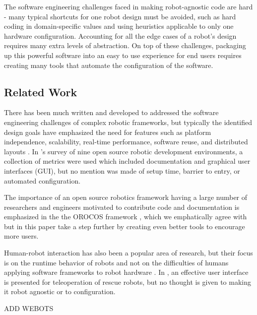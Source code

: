 \documentclass[10pt,journal,compsoc]{joser1}
\begin{document}
{The software engineering challenges faced in making robot-agnostic code are hard - many typical shortcuts for one robot design must be avoided, such as hard coding in domain-specific values and using heuristics applicable to only one hardware configuration. Accounting for all the edge cases of a robot's design requires many extra levels of abstraction. On top of these challenges, packaging up this powerful software into an easy to use experience for end users requires creating many tools that automate the configuration of the software.

\subsection{Related Work}

There has been much written and developed to addressed the software engineering challenges of complex robotic frameworks, but typically the identified design goals have emphasized the need for features such as platform independence, scalability, real-time performance, software reuse, and distributed layouts \cite{realtime_framework, collett2005player, kramer2007development}. In \cite{kramer2007development}'s survey of nine open source robotic development environments, a collection of metrics were used which included documentation and graphical user interfaces (GUI), but no mention was made of setup time, barrier to entry, or automated configuration. 

The importance of an open source robotics framework having a large number of researchers and engineers motivated to contribute code and documentation is emphasized in the the OROCOS framework \cite{bruyninckx2001open}, which we emphatically agree with but in this paper take a step further by creating even better tools to encourage more users.
  
Human-robot interaction has also been a popular area of research, but their focus is on the runtime behavior of robots and not on the difficulties of humans applying software frameworks to robot hardware \cite{hci_metrics, yancotaxonomy, goodrichseven}. In \cite{rescueRobots}, an effective user interface is presented for teleoperation of rescue robots, but no thought is given to making it robot agnostic or to configuration. 

ADD WEBOTS

}
\end{document}
